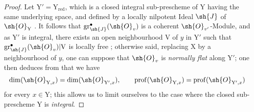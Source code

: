 \begin{proof}
Let $\mathrm{Y}'=\mathrm{Y}_\mathrm{red}$, which is a closed integral sub-prescheme of $\mathrm{Y}$ having the same underlying space, and defined by a locally nilpotent Ideal $\sh{J}$ of $\sh{O}_\mathrm{Y}$ . It follows that $\operatorname{gr}^{\bullet}_{\sh{J}}(\sh{O}_v)$ is a coherent $\sh{O}_{v'}$-Module, and as $\mathrm{Y}'$ is integral, there exists an open neighbourhood $\mathrm{V}$ of $y$ in $\mathrm{Y}'$ such that $\operatorname{gr}^{\bullet}_{\sh{J}}(\sh{O}_v)|\mathrm{V}$ is locally free ; otherwise said, replacing $\mathrm{X}$ by a neighbourhood of $y$, one can suppose that $\sh{O}_v$ is \emph{normally flat} along $\mathrm{Y}'$; one then deduces from  that we have
\[
\dim(\sh{O}_{\mathrm{Y},x})=\dim(\sh{O}_{\mathrm{Y}',x}),\qquad \operatorname{prof}(\sh{O}_{\mathrm{Y},x})=\operatorname{prof}(\sh{O}_{\mathrm{Y}',x})
\]
for every $x\in\mathrm{Y}$; this allows us to limit ourselves to the case where the closed sub-prescheme $\mathrm{Y}$ is \emph{integral}.


\end{proof}

